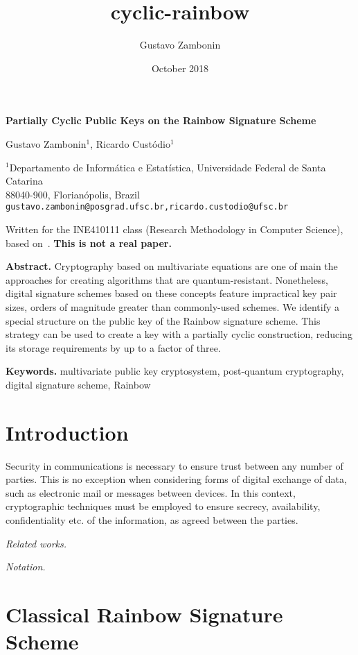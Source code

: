 \documentclass[a4paper, 14pt]{extarticle}
\title{cyclic-rainbow}
\author{Gustavo Zambonin}
\date{October 2018}
\begin{document}
\begin{center}
    {\Large\bf Partially Cyclic Public Keys on the Rainbow Signature Scheme} \vspace{.75cm}
    
    Gustavo Zambonin$^{1}$, Ricardo Custódio$^{1}$
    
    $^{1}$Departamento de Informática e Estatística, Universidade Federal de Santa Catarina \\
    88040-900, Florianópolis, Brazil \\
    \texttt{gustavo.zambonin@posgrad.ufsc.br,ricardo.custodio@ufsc.br}
    
     Written for the INE410111 class (Research Methodology in Computer Science), based on~\cite{petzoldt2013selecting}. \textbf{This is not a real paper.} \vspace{.75cm}
\end{center}

\textbf{Abstract.} Cryptography based on multivariate equations are one of main the approaches for creating algorithms that are quantum-resistant. Nonetheless, digital signature schemes based on these concepts feature impractical key pair sizes, orders of magnitude greater than commonly-used schemes. We identify a special structure on the public key of the Rainbow signature scheme. This strategy can be used to create a key with a partially cyclic construction, reducing its storage requirements by up to a factor of three.

\textbf{Keywords.} multivariate public key cryptosystem, post-quantum cryptography, digital signature scheme, Rainbow

\section{Introduction}

Security in communications is necessary to ensure trust between any number of parties. This is no exception when considering forms of digital exchange of data, such as electronic mail or messages between devices. In this context, cryptographic techniques must be employed to ensure secrecy, availability, confidentiality etc. of the information, as agreed between the parties.

\emph{Related works.}

\emph{Notation.}

\section{Classical Rainbow Signature Scheme}
\end{document}
